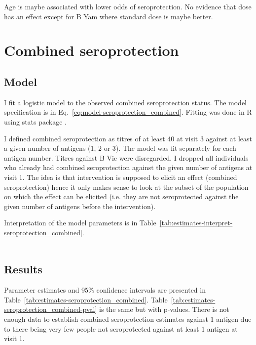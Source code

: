 \documentclass[11pt]{article}
\begin{document}
Age is maybe associated with lower odds of seroprotection. No evidence that
dose has an effect except for B Yam where standard dose is maybe better.

\section{Combined seroprotection}

\subsection{Model}

I fit a logistic model to the observed combined seroprotection status.
The model specification is in Eq.~\ref{eq:model-seroprotection_combined}.
Fitting was done in R using stats package \cite{R}.

I defined combined seroprotection as titres of at least 40 at visit 3 against
at least a given number of antigens (1, 2 or 3). The model was fit separately
for each antigen number.
Titres against B Vic were disregarded.
I dropped all individuals who already had combined seroprotection against
the given number of antigens at visit 1.
The idea is that intervention is supposed to elicit an effect
(combined seroprotection)
hence it only makes sense to look at the subset of the population on which
the effect can be elicited
(i.e. they are not seroprotected against the given number of antigens
before the intervention).

Interpretation of the model parameters is in
Table~\ref{tab:estimates-interpret-seroprotection_combined}.

\begin{equation}
    \begin{gathered}
        \label{eq:model-seroprotection_combined}
        
    \end{gathered}
\end{equation}





\subsection{Results}

Parameter estimates and 95\% confidence intervals
are presented in Table~\ref{tab:estimates-seroprotection_combined}.
Table~\ref{tab:estimates-seroprotection_combined-pval} is the same but with
p-values.
There is not enough data to establish combined seroprotection
estimates against 1 antigen due to there being very few people
not seroprotected against at least 1 antigen at visit 1.
\end{document}
